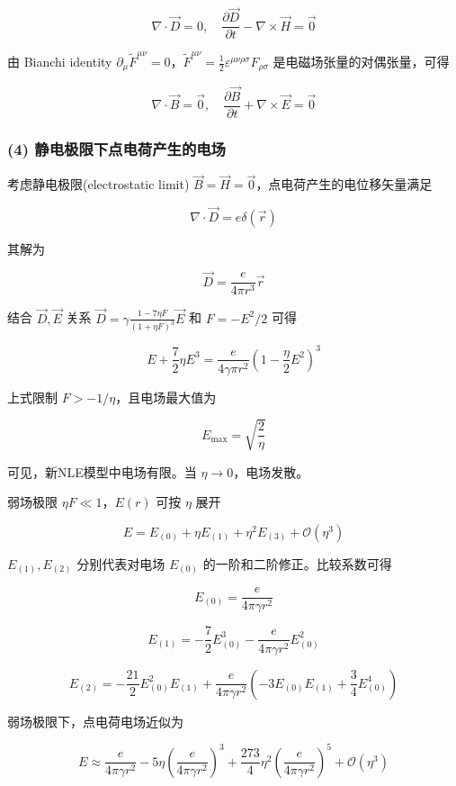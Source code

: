 \documentclass[aps,prl,preprint,groupedaddress]{revtex4-2}
\begin{document}
$$
\nabla\cdot\vec{D} = 0,\quad
\frac{\partial \vec{D} }{\partial t } - \nabla\times\vec{H}= \vec{0} 
$$
    
由 Bianchi identity $\partial_\mu \tilde{F}^{\mu \nu}=0 $，$\tilde{F}^{\mu\nu}=\frac{1 }{2 } \varepsilon^{\mu\nu\rho\sigma}F_{\rho\sigma} $ 是电磁场张量的对偶张量，可得
    
$$
\nabla\cdot\vec{B} = \vec{0},\quad 
\frac{\partial \vec{B} }{\partial t } + \nabla\times\vec{E} = \vec{0} 
$$

\subsubsection{(4) 静电极限下点电荷产生的电场}

考虑静电极限(electrostatic limit) $\vec{B}=\vec{H}=\vec{0} $，点电荷产生的电位移矢量满足

$$
\nabla\cdot\vec{D} = e\delta(\vec{r})
$$

其解为

$$
\vec{D}
=\frac{e }{4\pi r^3 } \vec{r}
$$

结合 $\vec{D},\vec{E} $ 关系 $\vec{D}=\gamma\frac{1-7\eta F }{(1+\eta F)^3 }\vec{E} $ 和 $F=-E^2/2 $ 可得

$$
E+\frac{7 }{2 } \eta E^3
=\frac{e }{4\gamma \pi r^2 } \left(1-\frac{\eta  }{2 } E^2 \right)^3 
$$

上式限制 $F>-1/\eta$，且电场最大值为

$$
E_{\max}=\sqrt{\frac{2 }{\eta } }
$$

可见，新NLE模型中电场有限。当 $\eta\to 0 $，电场发散。

弱场极限 $\eta F\ll 1 $，$E(r) $ 可按 $\eta $ 展开

$$
E
=E_{(0)} + \eta E_{(1)} + \eta^2 E_{(3)} + \mathcal{O}\left(\eta^3 \right)
$$

$E_{(1)},E_{(2)} $ 分别代表对电场 $E_{(0)} $ 的一阶和二阶修正。比较系数可得
    
$$
E_{(0)}
=\frac{e }{4\pi\gamma r^2 }
$$

$$
E_{(1)} 
=-\frac{7 }{2 } E_{(0)}^3 - \frac{e }{4\pi \gamma r^2 } E_{(0)}^2
$$

$$
E_{(2)}
=-\frac{21 }{2 } E_{(0)}^2 E_{(1)} + \frac{e }{4\pi\gamma r^2 } \left(-3E_{(0)}E_{(1)} + \frac{3 }{4 } E_{(0)}^4 \right)
$$

弱场极限下，点电荷电场近似为

$$
E
\approx \frac{e }{4\pi\gamma r^2 } - 5\eta\left(\frac{e }{4\pi\gamma r^2 }  \right)^3 + \frac{273 }{4 } \eta^2\left(\frac{e }{4\pi\gamma r^2 }  \right)^5 + \mathcal{O}\left(\eta^3 \right)
$$
\end{document}
